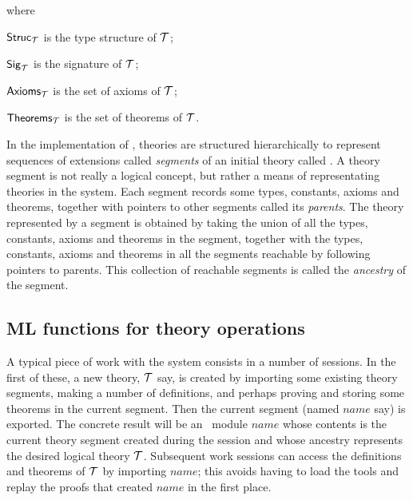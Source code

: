 \noindent where
\begin{myenumerate}
\item ${\sf Struc}_{\cal T}$ is
the type structure of ${\cal T}$;
\item ${\sf Sig}_{\cal T}$ is
the signature of ${\cal T}$;
\item ${\sf Axioms}_{\cal T}$ is
the set of axioms of ${\cal T}$;
\item ${\sf Theorems}_{\cal T}$ is the set of
theorems of ${\cal T}$.
\end{myenumerate}

In the implementation of \HOL, theories are structured hierarchically
to represent sequences of extensions called
\emph{segments}
%
%
of an initial theory called . A theory
segment is not really a logical concept, but rather a means of
representating theories in the \HOL{} system. Each segment records
some types, constants, axioms and theorems, together with pointers to
other segments called its \emph{parents}.
%
%
The theory represented by a segment is obtained by taking the union of
all the types, constants, axioms and theorems in the segment, together
with the types, constants, axioms and theorems in all the segments
reachable by following pointers to parents. This collection of
reachable segments is called the \emph{ancestry}
%
%
of the segment.


\subsection{ML functions for theory operations}
\label{theoryprims}

A typical piece of work
with the \HOL{} system consists in a number of sessions.  In the first of these, a
new theory, ${\cal T}$ say, is created by importing some existing theory
segments, making a number of definitions, and perhaps proving and
storing some theorems in the current segment. Then the current segment
(named $name$ say) is exported. The concrete result will be an \ML\
module $name$ whose contents is the current theory segment
created during the session and whose ancestry represents the desired
logical theory ${\cal T}$. Subsequent work sessions can access the
definitions and theorems of ${\cal T}$ by importing $name$;
this avoids having to load the tools and replay
the proofs that created $name$\ml{Theory} in the first place.

